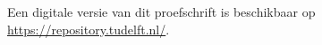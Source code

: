 \begin{titlepage}
\vspace{\bigskipamount}



\noindent
Een digitale versie van dit proefschrift is beschikbaar op \\
\url{https://repository.tudelft.nl/}.


\end{titlepage}
